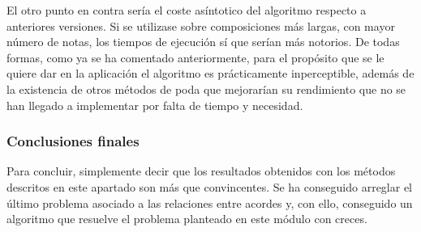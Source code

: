 El otro punto en contra sería el coste asíntotico del algoritmo respecto a anteriores versiones. Si se utilizase sobre composiciones más largas, con mayor número de notas, los tiempos de ejecución sí que serían más notorios. De todas formas, como ya se ha comentado anteriormente, para el propósito que se le quiere dar en la aplicación el algoritmo es prácticamente inperceptible, además de la existencia de otros métodos de poda que mejorarían su rendimiento que no se han llegado a implementar por falta de tiempo y necesidad. 

\subsubsection{Conclusiones finales}

Para concluir, simplemente decir que los resultados obtenidos con los métodos descritos en este apartado son más que convincentes. Se ha conseguido arreglar el último problema asociado a las relaciones entre acordes y, con ello, conseguido un algoritmo que resuelve el problema planteado en este módulo con creces.
    


    
